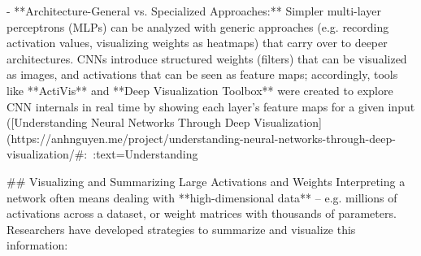 - **Architecture-General vs. Specialized Approaches:** Simpler multi-layer perceptrons (MLPs) can be analyzed with generic approaches (e.g. recording activation values, visualizing weights as heatmaps) that carry over to deeper architectures. CNNs introduce structured weights (filters) that can be visualized as images, and activations that can be seen as feature maps; accordingly, tools like **ActiVis** and **Deep Visualization Toolbox** were created to explore CNN internals in real time by showing each layer’s feature maps for a given input ([Understanding Neural Networks Through Deep Visualization](https://anhnguyen.me/project/understanding-neural-networks-through-deep-visualization/#:~:text=Understanding%

## Visualizing and Summarizing Large Activations and Weights
Interpreting a network often means dealing with **high-dimensional data** – e.g. millions of activations across a dataset, or weight matrices with thousands of parameters. Researchers have developed strategies to summarize and visualize this information:

